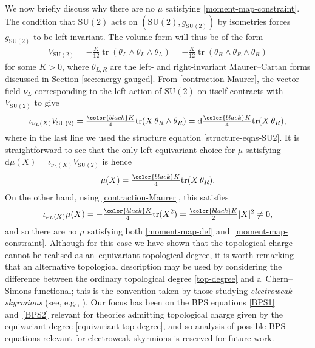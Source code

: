 \documentclass[10pt,a4paper]{amsart}
\newcommand{\SU}{{\mathrm{SU}}}
\newcommand{\1}{{\mathbb{1}}}
\def \d{\mathrm{d}}
\newcommand{\tr}{{\operatorname{tr}}}
\numberwithin{equation}{section}
\begin{document}
We now briefly discuss why there are no $\mu$ satisfying \eqref{moment-map-constraint}. The condition that $\SU(2)$ acts on $(\SU(2),g_{\SU(2)})$ by isometries forces $g_{\SU(2)}$ to be left-invariant. The volume form will thus be of the form
\begin{align*}
 V_{\SU(2)}=-\frac{K}{12}\tr(\theta_L\wedge\theta_L\wedge\theta_L)=-\frac{K}{12}\tr(\theta_R\wedge\theta_R\wedge\theta_R)
\end{align*}
for some $K>0$, where $\theta_{L,R}$ are the left- and right-invariant Maurer--Cartan forms discussed in Section \ref{sec:energy-gauged}. From \eqref{contraction-Maurer}, the vector field $\nu_L$ corresponding to the left-action of $\SU(2)$ on itself contracts with $V_{\SU(2)}$ to give
\begin{align*}
 \iota_{\nu_L(X)}V_{\SU(2)}=\tfrac{\begingroup\color{black}K\endgroup}{4}\tr(X\,\theta_R\wedge\theta_R)=\d\tfrac{\begingroup\color{black}K\endgroup}{4}\tr(X\,\theta_R),
\end{align*}
where in the last line we used the structure equation \eqref{structure-eqns-SU2}. It is straightforward to see that the only left-equivariant choice for $\mu$ satisfying $\d\mu(X)=\iota_{\nu_L(X)}V_{\SU(2)}$ is hence
\begin{align*}
 \mu(X)=\tfrac{\begingroup\color{black}K\endgroup}{4}\tr(X\,\theta_R).
\end{align*}
On the other hand, using \eqref{contraction-Maurer}, this satisfies
\begin{align*}
 \iota_{\nu_L(X)}\mu(X)=-\tfrac{\begingroup\color{black}K\endgroup}{4}\tr(X^2)=\tfrac{\begingroup\color{black}K\endgroup}{2}|X|^2\neq0,
\end{align*}
and so there are no $\mu$ satisfying both \eqref{moment-map-def} and~\eqref{moment-map-constraint}.
Although for this case we have shown that the topological charge cannot be realised as an~equivariant topological degree, it is worth remarking that an alternative topological description may be used by considering the difference between the ordinary topological degree \eqref{top-degree} and a~Chern--Simons functional; this is the convention taken by those studying \textit{electroweak skyrmions} (see, e.g., \cite{criadoKhozeSpannowsky2021emergence,dHokerFarhi1984decoupling}). Our focus has been on the BPS equations \eqref{BPS1} and~\eqref{BPS2} relevant for theories admitting topological charge given by the equivariant degree \eqref{equivariant-top-degree}, and so analysis of possible BPS equations relevant for electroweak skyrmions is reserved for future work.
\end{document}
